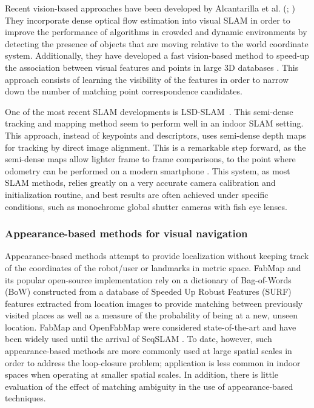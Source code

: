 Recent vision-based approaches have been developed by Alcantarilla et al. (\citeyear{alcantarilla2010visual}; \citeyear{alcantarilla2012combining}) They incorporate dense optical flow estimation into visual SLAM in order to improve the performance of algorithms in crowded and dynamic environments by detecting the presence of objects that are moving relative to the world coordinate system. Additionally, they have developed a fast vision-based method to speed-up the association between visual features and points in large 3D databases \citep{alcantarilla2010learning}. This approach consists of learning the visibility of the features in order to narrow down the number of matching point correspondence candidates.

One of the most recent SLAM developments is LSD-SLAM~\citep{engel14eccv}. This semi-dense tracking and mapping method seem to perform well in an indoor SLAM setting. This approach, instead of keypoints and descriptors, uses semi-dense depth maps for tracking by direct image alignment. This is a remarkable step forward, as the semi-dense maps allow lighter frame to frame comparisons, to the point where odometry can be performed on a modern smartphone \citep{schoeps14ismar}. This system, as most SLAM methods, relies greatly on a very accurate camera calibration and initialization routine, and best results are often achieved under specific conditions, such as monochrome global shutter cameras with fish eye lenses.

\subsubsection{Appearance-based methods for visual navigation}
Appearance-based methods attempt to provide localization without keeping track of the coordinates of the robot/user or landmarks in metric space. FabMap \citep{cumminsFabMap2010} and its popular open-source implementation \citep{OpenFabMap2011} rely on a dictionary of Bag-of-Words (BoW) constructed from a database of Speeded Up Robust Features (SURF) features extracted from location images to provide matching between previously visited places as well as a measure of the probability of being at a new, unseen location. FabMap and OpenFabMap were considered state-of-the-art and have been widely used until the arrival of SeqSLAM \cite{SeqSLAM}. To date, however, such appearance-based methods are more commonly used at large spatial scales in order to address the loop-closure problem; application is less common  in indoor spaces when operating at smaller spatial scales. In addition, there is little evaluation of the effect of matching ambiguity in the use of appearance-based techniques. 

